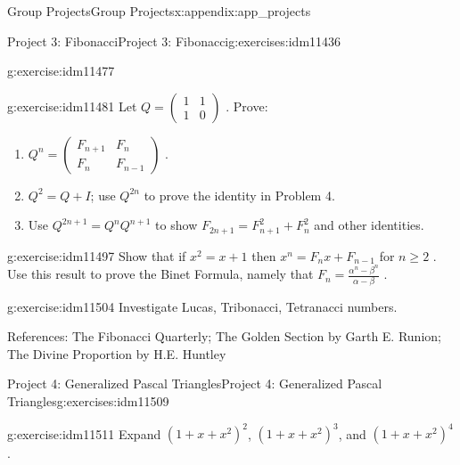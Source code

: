 \documentclass[oneside,10pt,]{book}
\numberwithin{equation}{chapter}
\newcommand{\amp}{&}
\begin{document}
\begin{appendixptx}{Group Projects}{}{Group Projects}{}{}{x:appendix:app_projects}
\begin{exercises-section-numberless}{Project 3: Fibonacci}{}{Project 3: Fibonacci}{}{}{g:exercises:idm11436}
\begin{divisionexercise}{6}{}{}{g:exercise:idm11477}
\begin{equation*}
\end{equation*}
%
\end{divisionexercise}%
\begin{divisionexercise}{7}{}{}{g:exercise:idm11481}%
Let \(Q =\begin{pmatrix}1 \amp 1 \\ 1 \amp 0\end{pmatrix}\) . Prove:%
\begin{enumerate}[label=(\alph*)]
\item{}\(Q^{n} = \begin{pmatrix} F_{n + 1} \amp F_{n}\\ F_{n} \amp F_{n - 1} \end{pmatrix}\) .%
\item{}\(Q^{2} = Q + I\); use \(Q^{2n}\) to prove the identity in Problem 4.%
\item{}Use \(Q^{2n + 1} = Q^{n}Q^{n + 1}\) to show \(F_{2n + 1} = F_{n + 1}^{2} + F_{n}^{2}\) and other identities.%
\end{enumerate}
%
\end{divisionexercise}%
\begin{divisionexercise}{8}{}{}{g:exercise:idm11497}%
Show that if \(x^{2} = x + 1\) then \(x^{n} = F_{n}x + F_{n - 1}\) for \(n \geq 2\) . Use this result to prove the Binet Formula, namely that \(F_{n} = \frac{\alpha^{n} - \beta^{n}}{\alpha - \beta}\) .%
\end{divisionexercise}%
\begin{divisionexercise}{9}{}{}{g:exercise:idm11504}%
Investigate Lucas, Tribonacci, Tetranacci numbers.%
\end{divisionexercise}%
\begin{conclusion}{}%
References: The Fibonacci Quarterly; The Golden Section by Garth E. Runion; The Divine Proportion by H.E. Huntley%
\end{conclusion}%
\end{exercises-section-numberless}
%
%
\typeout{************************************************}
\typeout{************************************************}
%
\begin{exercises-section-numberless}{Project 4: Generalized Pascal Triangles}{}{Project 4: Generalized Pascal Triangles}{}{}{g:exercises:idm11509}
\begin{divisionexercise}{1}{}{}{g:exercise:idm11511}%
Expand \({\left( 1 + x + x^{2} \right)}^{2}\), \(\left( 1 + x + x^{2} \right)^{3}\), and \(\left( 1 + x + x^{2} \right)^{4}\).%

\end{divisionexercise}
\end{exercises-section-numberless}
\end{appendixptx}
\end{document}
